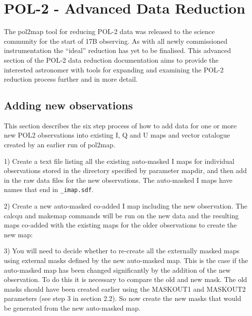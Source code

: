 \chapter{POL-2 - Advanced Data Reduction}
\label{sec:advanced}


The pol2map tool for reducing POL-2 data was released to the science
community for the start of 17B observing. As with all newly commissioned
instrumentation the ``ideal'' reduction has yet to be finalised. This advanced
section of the POL-2 data reduction documentation aims to provide the interested
astronomer with tools for expanding and examining the POL-2 reduction process further and
in more detail.


\section{Adding new observations}

This section describes the six step process of how to add
data for one or more new POL2 observations into existing I,
Q and U maps and vector catalogue created by an earlier run of pol2map.

1) Create a text file listing all the existing auto-masked I maps for individual observations
stored in the directory specified by parameter mapdir, and then add in the raw data files
for the new observations. The auto-masked I maps have names that end in \texttt{_imap.sdf}.

\begin{terminalv}
\end{terminalv}


2) Create a new auto-masked co-added I map including the new observation. The
calcqu  and makemap
commands will be run on the new data and the resulting maps co-added
with the existing maps for the older observations to create the new map:

\begin{terminalv}
\end{terminalv}


3) You will need to decide whether to re-create all the externally masked maps using
external masks defined by the new auto-masked map. This is the case if the auto-masked
map has been changed significantly by the addition of the new observation. To do this it is
necessary to compare the old and new mask.  The old masks should have been created
earlier using the MASKOUT1 and MASKOUT2 parameters (see step 3 in section 2.2). So
now create the new masks that would be generated from the new auto-masked map.

